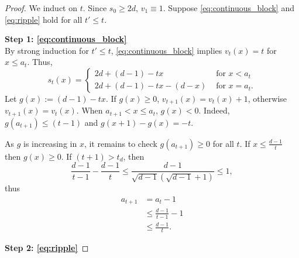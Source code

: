 \documentclass[12pt]{amsart}
\begin{document}
	\begin{proof}
		We induct on $t$. Since $s_0 \geq 2 d$, $v_1 \equiv 1$.  Suppose \eqref{eq:continuous_block}  and \eqref{eq:ripple} hold for all $t' \leq t$. 
		
		
		{\bf Step 1: \eqref{eq:continuous_block}} \\
		By strong induction for $t' \leq t$, \eqref{eq:continuous_block} implies $v_t(x) = t$ for $x \leq a_t$. Thus, 
		\[
		s_t(x) = \begin{cases}
		2 d + (d-1) - t x  &\mbox{ for $x < a_t$} \\
		2 d + (d-1) - t x - (d-x) &\mbox{ for $x = a_t$}.
		\end{cases}
		\]
		Let $g(x) := (d-1) - t x$. If $g(x) \geq 0$, $v_{t+1}(x) = v_t(x) + 1$, otherwise $v_{t+1}(x) = v_t(x)$. When $a_{t+1} < x \leq a_t$, $g(x) < 0$. Indeed,  $g(a_{t+1}) \leq (t-1)$ and $g(x+1) - g(x) = - t$. 
		
		
		
		
		As $g$ is increasing in $x$, it remains to check $g(a_{t+1}) \geq 0$ for all $t$.  
		If $x \leq  \frac{ d - 1}{t}$ then $g(x) \geq 0$. 
		If $(t+1) > t_d$, then
		\[
		\frac{d - 1}{t-1}  -  \frac{ d - 1}{t} \leq \frac{d-1}{\sqrt{d-1}\left(\sqrt{d-1}+1\right)} \leq 1,
		\]
		thus 
		\begin{align*}
		a_{t+1} &= a_{t} - 1  \\ 
		&\leq \frac{d-1}{t-1} -1  \\
		&\leq \frac{ d - 1}{t}. 
		\end{align*}
		
		
		{\bf Step 2: \eqref{eq:ripple}}
		

\end{proof}
\end{document}
